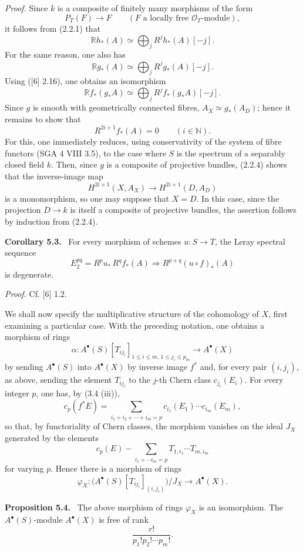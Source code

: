 \documentclass[11pt]{article}
\newenvironment{statement}[1]{\par\medskip\noindent\textbf{#1.}\ }{\par\medskip}
\begin{document}
\emph{Proof.} Since $k$ is a composite of finitely many morphisms of the form
\[
P_T(F)\to F\qquad(F\text{ a locally free }\mathcal O_T\text{-module}),
\tag{Q}
\]
it follows from (2.2.1) that
\[
\mathbb{R}h_*(A)\simeq\bigoplus_j R^jh_*(A)[-j].
\]
For the same reason, one also has
\[
\mathbb{R}g_*(A)\simeq\bigoplus_j R^jg_*(A)[-j].
\]
Using ([6] 2.16), one obtains an isomorphism
\[
\mathbb{R}f_*(g_*A)\simeq\bigoplus_j R^j f_*(g_*A)[-j].
\]
Since $g$ is smooth with geometrically connected fibres, $A_X\simeq g_*(A_D)$; hence it remains to show that
\[
R^{2i+1}f_*(A)=0\qquad (i\in\mathbb N).
\tag{5.2.1}
\]
For this, one immediately reduces, using conservativity of the system of fibre functors (SGA 4 VIII 3.5), to the case where $S$ is the spectrum of a separably closed field $k$. Then, since $g$ is a composite of projective bundles, (2.2.4) shows that the inverse-image map
\[
H^{2i+1}(X,A_X)\to H^{2i+1}(D,A_D)
\]
is a monomorphism, so one may suppose that $X=D$. In this case, since the projection $D\to k$ is itself a composite of projective bundles, the assertion follows by induction from (2.2.4).

\begin{statement}{Corollary 5.3}
For every morphism of schemes $u:S\to T$, the Leray spectral sequence
\[
E_2^{pq}=R^p u_*\,R^q f_*(A)\Rightarrow R^{p+q}(u\circ f)_*(A)
\]
is degenerate.
\end{statement}

\emph{Proof.} Cf. [6] 1.2.

We shall now specify the multiplicative structure of the cohomology of $X$, first examining a particular case. With the preceding notation, one obtains a morphism of rings
\[
\alpha:A^{\bullet}(S)[T_{ij_i}]_{1\le i\le m,\,1\le j_i\le p_m}\to A^{\bullet}(X)
\]
by sending $A^{\bullet}(S)$ into $A^{\bullet}(X)$ by inverse image $f^*$ and, for every pair $(i,j_i)$, as above, sending the element $T_{ij_i}$ to the $j$-th Chern class $c_{j_i}(E_i)$. For every integer $p$, one has, by (3.4 (iii)),
\[
c_p(f^*E)=\sum_{i_1+i_2+\cdots+i_m=p}c_{i_1}(E_1)\cdots c_{i_m}(E_m),
\]
so that, by functoriality of Chern classes, the morphism vanishes on the ideal $J_X$ generated by the elements
\[
c_p(E)-\sum_{i_1+\cdots i_m=p}T_{1,i_1}\cdots T_{m,i_m}
\]
for varying $p$. Hence there is a morphism of rings
\[
\varphi_X:\bigl(A^{\bullet}(S)[T_{ij_i}]_{(i,j_i)}\bigr)/J_X\to A^{\bullet}(X).
\]

\begin{statement}{Proposition 5.4}
The above morphism of rings $\varphi_X$ is an isomorphism. The $A^{\bullet}(S)$-module $A^{\bullet}(X)$ is free of rank
\[
\frac{r!}{p_1!p_2!\cdots p_m!}.
\]
\end{statement}
\end{document}
